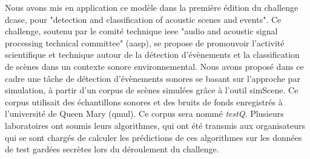 %
%
%
%
%

%         

Nous avons mis en application ce modèle dans la première édition du challenge dcase, pour "detection and classification of acoustic scenes and events". Ce challenge, soutenu par le comité technique ieee "audio and acoustic signal processing technical committee" (aasp), se propose de promouvoir l'activité scientifique et technique autour de la détection d'évènements et la classification de scènes dans un contexte sonore environnemental. Nous avons proposé dans ce cadre une tâche de détection d'évènements sonores se basant sur l'approche par simulation, à partir d'un corpus de scènes simulées grâce à l'outil simScene. Ce corpus utilisait des échantillons sonores et des bruits de fonds enregistrés à l'université de Queen Mary (qmul). Ce corpus sera nommé \emph{testQ}. Plusieurs laboratoires ont soumis leurs algorithmes, qui ont été transmis aux organisateurs qui se sont chargés de calculer les prédictions de ces algorithmes sur les données de test gardées secrètes lors du déroulement du challenge.

